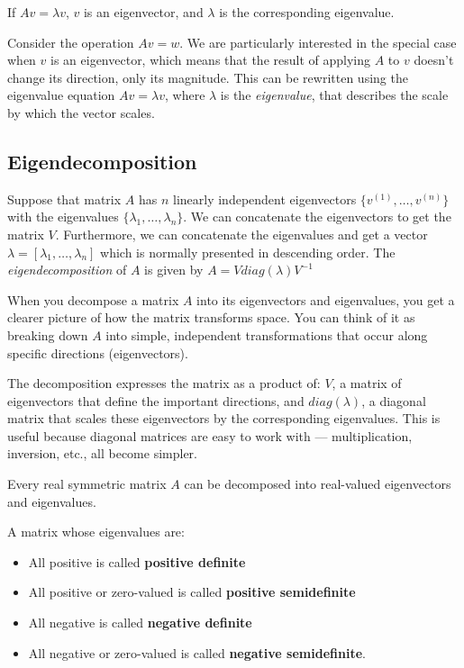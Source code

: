 If $Av = \lambda v$, $v$ is an eigenvector, and $\lambda$ is the corresponding eigenvalue.

Consider the operation $Av = w$. We are particularly interested in the special case when $v$ is an eigenvector, which means that the result of applying $A$ to $v$ doesn't change its direction, only its magnitude. This can be rewritten using the eigenvalue equation $Av = \lambda v$, where \(\lambda\) is the \textit{eigenvalue}, that describes the scale by which the vector scales.


\subsection{Eigendecomposition}%
\label{subsec:label}

Suppose that matrix $A$ has $n$ linearly independent eigenvectors $\{v^{(1)}, \ldots, v^{(n)}\}$ with the eigenvalues $\{\lambda_{1}, \ldots, \lambda_{n}\}$. We can concatenate the eigenvectors to get the matrix $V$. Furthermore, we can concatenate the eigenvalues and get a vector $\lambda = [\lambda_{1}, \ldots, \lambda_{n}]$ which is normally presented in descending order. The \textit{eigendecomposition} of $A$ is given by $A = Vdiag(\lambda)V^{-1}$

When you decompose a matrix $A$ into its eigenvectors and eigenvalues, you get a clearer picture of how the matrix transforms space. You can think of it as breaking down $A$ into simple, independent transformations that occur along specific directions (eigenvectors).

The decomposition expresses the matrix as a product of: $V$, a matrix of eigenvectors that define the important directions, and $diag(\lambda)$, a diagonal matrix that scales these eigenvectors by the corresponding eigenvalues.
This is useful because diagonal matrices are easy to work with — multiplication, inversion, etc., all become simpler.

Every real symmetric matrix $A$ can be decomposed into real-valued eigenvectors and eigenvalues.

A matrix whose eigenvalues are:
\begin{itemize}
	\item All positive is called \textbf{positive definite}
	\item All positive or zero-valued is called \textbf{positive semidefinite}
	\item All negative is called \textbf{negative definite}
	\item All negative or zero-valued is called \textbf{negative semidefinite}.
\end{itemize}












